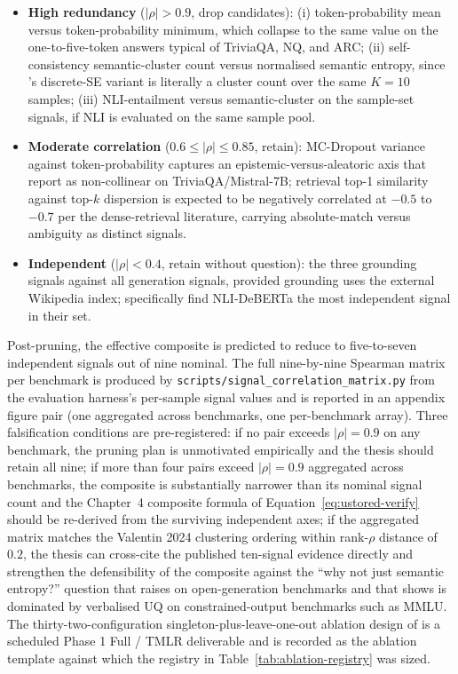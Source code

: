 \begin{itemize}
    \item \textbf{High redundancy} ($|\rho| > 0.9$, drop candidates):
          (i) token-probability mean versus token-probability minimum,
          which collapse to the same value on the one-to-five-token
          answers typical of TriviaQA, NQ, and ARC; (ii) self-consistency
          semantic-cluster count versus normalised semantic entropy,
          since \citet{farquhar2024nature}'s discrete-SE variant is
          literally a cluster count over the same $K=10$ samples;
          (iii) NLI-entailment versus semantic-cluster on the sample-set
          signals, if NLI is evaluated on the same sample pool.
    \item \textbf{Moderate correlation} ($0.6 \le |\rho| \le 0.85$,
          retain): MC-Dropout variance against token-probability
          captures an epistemic-versus-aleatoric axis that
          \citet{vashurin2024polygraph} report as non-collinear on
          TriviaQA/Mistral-7B; retrieval top-1 similarity against
          top-$k$ dispersion is expected to be negatively correlated at
          $-0.5$ to $-0.7$ per the dense-retrieval literature, carrying
          absolute-match versus ambiguity as distinct signals.
    \item \textbf{Independent} ($|\rho| < 0.4$, retain without
          question): the three grounding signals against all generation
          signals, provided grounding uses the external Wikipedia
          index; \citet{valentin2024hallucination} specifically find
          NLI-DeBERTa the most independent signal in their set.
\end{itemize}
Post-pruning, the effective composite is predicted to reduce to
five-to-seven independent signals out of nine nominal. The full
nine-by-nine Spearman matrix per benchmark is produced by
\texttt{scripts/signal\_correlation\_matrix.py} from the evaluation
harness's per-sample signal values and is reported in
an appendix figure pair (one
aggregated across benchmarks, one per-benchmark array). Three falsification conditions are pre-registered: if no pair exceeds
$|\rho| = 0.9$ on any benchmark, the pruning plan is unmotivated
empirically and the thesis should retain all nine; if more than four
pairs exceed $|\rho| = 0.9$ aggregated across benchmarks, the
composite is substantially narrower than its nominal signal count
and the Chapter~4 composite formula of
Equation~\ref{eq:ustored-verify} should be re-derived from the
surviving independent axes; if the aggregated matrix matches the
Valentin 2024 clustering ordering within rank-$\rho$ distance of
$0.2$, the thesis can cross-cite the published ten-signal evidence
directly and strengthen the defensibility of the composite against
the ``why not just semantic entropy?'' question that
\citet{farquhar2024nature} raises on open-generation benchmarks and
that \citet{vashurin2024polygraph} shows is dominated by verbalised
UQ on constrained-output benchmarks such as MMLU. The
thirty-two-configuration singleton-plus-leave-one-out ablation design
of \citet{kuhn2023semantic} is a scheduled Phase 1 Full / TMLR
deliverable and is recorded as the ablation template against which
the registry in Table~\ref{tab:ablation-registry} was sized.

